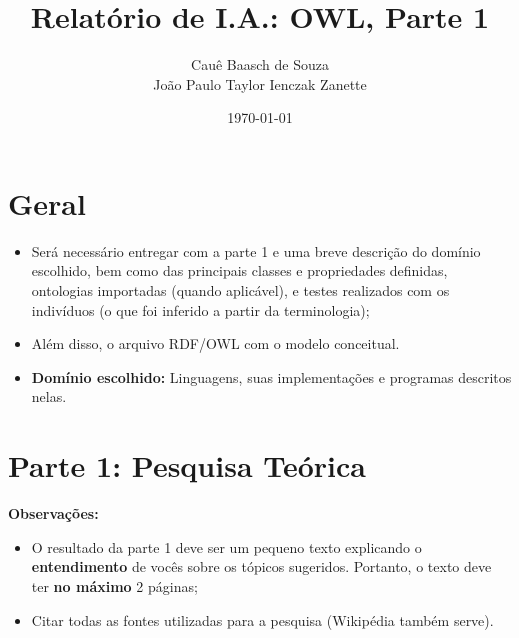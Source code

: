 \documentclass[answers]{exam}
\title{Relatório de I.A.: OWL, Parte 1}
\author{Cauê Baasch de Souza \\
        João Paulo Taylor Ienczak Zanette}
\date{\today}
\newcommand{\todo}[1]{{\color{red}{#1}}}
\begin{document}
    \maketitle{}

    \todo{%
        TO-DO\@:
        \begin{itemize}
            \item Adicionar enunciado da 2ª parte (parte prática);
            \item Escolher domínio dos exemplos.
        \end{itemize}
    }

    \section{Geral}

    \begin{superframe}
        \begin{itemize}
            \item Será necessário entregar com a parte 1 e uma breve descrição
                do domínio escolhido, bem como das principais classes e
                propriedades definidas, ontologias importadas (quando
                aplicável), e testes realizados com os indivíduos (o que foi
                inferido a partir da terminologia);

            \item Além disso, o arquivo RDF/OWL com o modelo conceitual.
            \item \textbf{Domínio escolhido:} Linguagens, suas implementações e
                programas descritos nelas.
        \end{itemize}
    \end{superframe}

    \section{Parte 1: Pesquisa Teórica}

    \begin{superframe}
        \textbf{Observações:}

        \begin{itemize}
            \item O resultado da parte 1 deve ser um pequeno texto
                explicando o \textbf{entendimento} de vocês sobre os
                tópicos sugeridos. Portanto, o texto deve ter \textbf{no
                máximo} 2 páginas;
            \item Citar todas as fontes utilizadas para a pesquisa
                (Wikipédia também serve).
        \end{itemize}
    \end{superframe}
\end{document}
